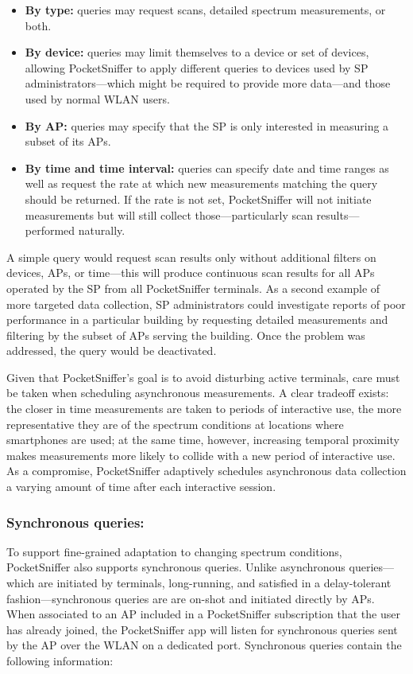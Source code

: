 \begin{itemize}

\item \textbf{By type:} queries may request scans, detailed spectrum
measurements, or both.

\item \textbf{By device:} queries may limit themselves to a device or set of
devices, allowing PocketSniffer to apply different queries to devices used by
SP administrators---which might be required to provide more data---and those
used by normal WLAN users.

\item \textbf{By AP:} queries may specify that the SP is only interested in
measuring a subset of its APs.

\item \textbf{By time and time interval:} queries can specify date and time
ranges as well as request the rate at which new measurements matching the
query should be returned. If the rate is not set, PocketSniffer will not
initiate measurements but will still collect those---particularly scan
results---performed naturally.

\end{itemize}

A simple query would request scan results only without additional filters on
devices, APs, or time---this will produce continuous scan results for all APs
operated by the SP from all PocketSniffer terminals. As a second example of
more targeted data collection, SP administrators could investigate reports of
poor performance in a particular building by requesting detailed measurements
and filtering by the subset of APs serving the building. Once the problem was
addressed, the query would be deactivated.

Given that PocketSniffer's goal is to avoid disturbing active terminals, care
must be taken when scheduling asynchronous measurements. A clear tradeoff
exists: the closer in time measurements are taken to periods of interactive
use, the more representative they are of the spectrum conditions at locations
where smartphones are used; at the same time, however, increasing temporal
proximity makes measurements more likely to collide with a new period of
interactive use. As a compromise, PocketSniffer adaptively schedules
asynchronous data collection a varying amount of time after each interactive
session. 

\subsubsection{Synchronous queries:\space} To support fine-grained adaptation
to changing spectrum conditions, PocketSniffer also supports synchronous
queries. Unlike asynchronous queries---which are initiated by terminals,
long-running, and satisfied in a delay-tolerant fashion---synchronous queries
are are on-shot and initiated directly by APs. When associated to an AP
included in a PocketSniffer subscription that the user has already joined,
the PocketSniffer app will listen for synchronous queries sent by the AP over
the WLAN on a dedicated port. Synchronous queries contain the following
information:

